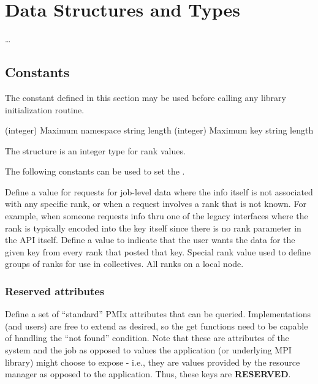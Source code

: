 \chapter{Data Structures and Types}
\label{chap:struct}

\ldots

\section{Constants}

The constant defined in this section may be used before calling any library initialization routine.

\begin{constantdesc}
%
 (integer)
Maximum namespace string length
%
 (integer)
Maximum key string length
%
\end{constantdesc}

The  structure is an integer type for rank values.

The following constants can be used to set the .

\begin{constantdesc}
%
Define a value for requests for job-level data where the info itself is not associated with any specific rank, or when a request involves a rank that is not known.
For example, when someone requests info thru one of the legacy interfaces where the rank is typically encoded into the key itself since there is no rank parameter in the API itself.
%
Define a value to indicate that the user wants the data for the given key from every rank that posted that key.
%
Special rank value used to define groups of ranks for use in collectives.
All ranks on a local node.
%
\end{constantdesc}


\subsection{Reserved attributes}
\label{api:struct:attributes}

Define a set of ``standard'' PMIx attributes that can be queried.
Implementations (and users) are free to extend as desired, so the get functions need to be capable of handling the ``not found'' condition.
Note that these are attributes of the system and the job as opposed to values the application (or underlying \ac{MPI} library) might choose to expose - i.e., they are values provided by the resource manager as opposed to the application.
Thus, these keys are \textbf{RESERVED}.

